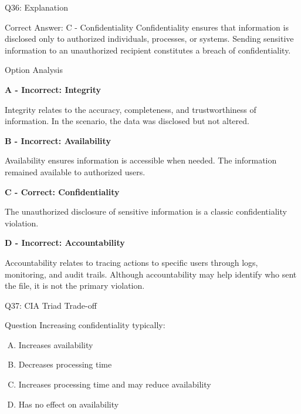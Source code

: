\documentclass{beamer}
\begin{document}
	\begin{frame}[shrink=10]{Q36: Explanation}
		\footnotesize
		
		\begin{block}{Correct Answer: C - Confidentiality}
			Confidentiality ensures that information is disclosed only to
			authorized individuals, processes, or systems. Sending sensitive
			information to an unauthorized recipient constitutes a breach of
			confidentiality.
		\end{block}
		
		\begin{block}{Option Analysis}
			
			\textbf{A - Incorrect: Integrity}
			
			Integrity relates to the accuracy, completeness, and
			trustworthiness of information. In the scenario, the data was
			disclosed but not altered.
			
			\vspace{0.15cm}
			
			\textbf{B - Incorrect: Availability}
			
			Availability ensures information is accessible when needed.
			The information remained available to authorized users.
			
			\vspace{0.15cm}
			
			\textbf{C - Correct: Confidentiality}
			
			The unauthorized disclosure of sensitive information is a
			classic confidentiality violation.
			
			\vspace{0.15cm}
			
			\textbf{D - Incorrect: Accountability}
			
			Accountability relates to tracing actions to specific users
			through logs, monitoring, and audit trails. Although
			accountability may help identify who sent the file, it is
			not the primary violation.
			
		\end{block}
		

		
	\end{frame}
	
	\begin{frame}{Q37: CIA Triad Trade-off}
		\begin{block}{Question}
			Increasing confidentiality typically:
		\end{block}
		\begin{enumerate}[(A)]
			\item Increases availability
			\item Decreases processing time
			\item Increases processing time and may reduce availability
			\item Has no effect on availability
		\end{enumerate}
	\end{frame}
	
\end{document}
